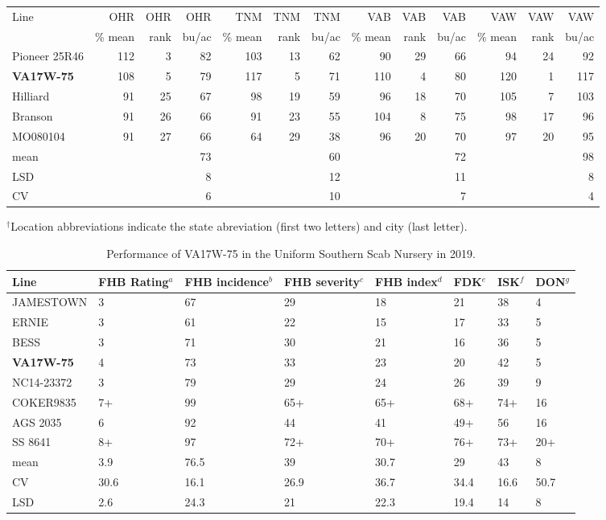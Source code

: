 \documentclass[12pt, letterpaper]{article}
\begin{document}
\begin{landscape}
\begin{table}
\bigskip

\begin{tabular}{|l|rrr|rrr|rrr|rrr|}
  \hline
Line & OHR & OHR & OHR & TNM & TNM & TNM & VAB & VAB & VAB & VAW & VAW & VAW \\ 
 & \% mean & rank & bu/ac & \% mean & rank & bu/ac & \% mean & rank & bu/ac & \% mean & rank & bu/ac \\ 
  \hline
Pioneer 25R46 & 112 &   3 &  82 & 103 &  13 &  62 &  90 &  29 &  66 &  94 &  24 &  92 \\ 
  \textbf{VA17W-75} & 108 &   5 &  79 & 117 &   5 &  71 & 110 &   4 &  80 & 120 &   1 & 117 \\ 
  Hilliard &  91 &  25 &  67 &  98 &  19 &  59 &  96 &  18 &  70 & 105 &   7 & 103 \\ 
  Branson &  91 &  26 &  66 &  91 &  23 &  55 & 104 &   8 &  75 &  98 &  17 &  96 \\ 
  MO080104 &  91 &  27 &  66 &  64 &  29 &  38 &  96 &  20 &  70 &  97 &  20 &  95 \\ 
  mean &  &  &  73 &  &  &  60 &  &  &  72 &  &  &  98 \\ 
  LSD &  &  &   8 &  &  &  12 &  &  &  11 &  &  &   8 \\ 
  CV &  &  &   6 &  &  &  10 &  &  &   7 &  &  &   4 \\ 
   \hline
\end{tabular}

\raggedright{
\footnotesize
$^\dagger$Location abbreviations indicate the state abreviation (first two letters) and city (last letter).}
\end{table}


\newpage

\begin{table}
\caption{Performance of VA17W-75 in the Uniform Southern Scab Nursery in 2019.}
\label{ussn}
\begin{tabular}{llllllll}
  \hline
Line & FHB Rating$^a$ & FHB incidence$^b$ & FHB severity$^c$ & FHB index$^d$ & FDK$^e$ & ISK$^f$ & DON$^g$ \\ 
  \hline
JAMESTOWN & 3 & 67 & 29 & 18 & 21 & 38 & 4 \\ 
  ERNIE & 3 & 61 & 22 & 15 & 17 & 33 & 5 \\ 
  BESS & 3 & 71 & 30 & 21 & 16 & 36 & 5 \\ 
  \textbf{VA17W-75} & 4 & 73 & 33 & 23 & 20 & 42 & 5 \\ 
  NC14-23372 & 3 & 79 & 29 & 24 & 26 & 39 & 9 \\ 
  COKER9835 & 7+ & 99 & 65+ & 65+ & 68+ & 74+ & 16 \\ 
  AGS 2035 & 6 & 92 & 44 & 41 & 49+ & 56 & 16 \\ 
  SS 8641 & 8+ & 97 & 72+ & 70+ & 76+ & 73+ & 20+ \\ 
  mean & 3.9 & 76.5 & 39 & 30.7 & 29 & 43 & 8 \\ 
  CV & 30.6 & 16.1 & 26.9 & 36.7 & 34.4 & 16.6 & 50.7 \\ 
  LSD & 2.6 & 24.3 & 21 & 22.3 & 19.4 & 14 & 8 \\ 
   \hline
\end{tabular}


\end{table}
\end{landscape}
\end{document}
